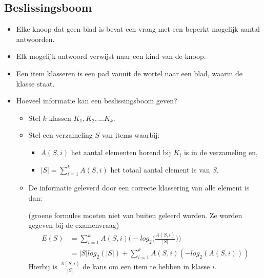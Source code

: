 \subsection{Beslissingsboom}
	\begin{itemize}
		\item Elke knoop dat geen blad is bevat een vraag met een beperkt mogelijk aantal antwoorden.
		\item Elk mogelijk antwoord verwijst naar een kind van de knoop.
		\item Een item klasseren is een pad vanuit de wortel naar een blad, waarin de klasse staat.
		\item Hoeveel informatie kan een beslissingsboom geven?
		\begin{itemize}
			\item Stel $k$ klassen $K_1, K_2, ... K_k$.
			\item Stel een verzameling $S$ van items waarbij:
			\begin{itemize}
				\item $A(S, i)$ het aantal elementen horend bij $K_i$ is in de verzameling en,
				\item $|S| = \sum_{i = 1}^k A(S,i)$ het totaal aantal element is van $S$.
			\end{itemize} 
			\item De informatie geleverd door een correcte klassering van alle element is dan:
			
			 {\color{OliveGreen}(groene formules moeten niet van buiten geleerd worden. Ze worden gegeven bij de examenvraag)}
			{\color{OliveGreen}
			\begin{equation*}
				\begin{split}
					E(S) & = \sum_{i = 1}^{k} A(S, i) \bigg(-log_2 \bigg( \frac{A(S, i)}{|S|}\bigg) \bigg) \\
					     & = |S|log_2(|S|) +  \sum_{i = 1}^{k} A(S, i)(-log_2(A(S, i)))
				\end{split}
			\end{equation*}
			}
			Hierbij is $\frac{A(S, i)}{|S|}$ de kans om een item te hebben in klasse $i$.
		\end{itemize}
		\end{itemize}
